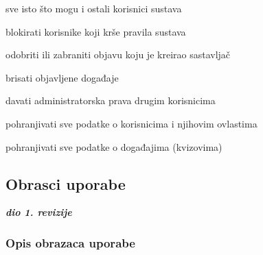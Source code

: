 \begin{packed_enum}
\begin{packed_enum}
				\end{packed_enum}
			
				\item  {}
				
				\begin{packed_enum}
					
					\item sve isto što mogu i ostali korisnici sustava
					\item blokirati korisnike koji krše pravila sustava 
					\item odobriti ili zabraniti objavu koju je kreirao sastavljač
					\item brisati objavljene događaje
					\item davati administratorska prava drugim korisnicima
					
				\end{packed_enum}
			
				\item  {}
				
				\begin{packed_enum}
					
					\item pohranjivati sve podatke o korisnicima i njihovim ovlastima
					\item pohranjivati sve podatke o događajima (kvizovima)
					
				\end{packed_enum}
			\end{packed_enum}
			
			\eject 
			
			
				
			\subsection{Obrasci uporabe}
				
				\textbf{\textit{dio 1. revizije}}
				
				\subsubsection{Opis obrazaca uporabe}
					
